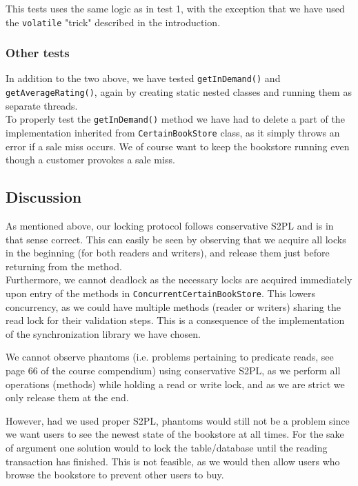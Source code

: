 \documentclass[11pt]{article}
\begin{document}
This tests uses the same logic as in test 1, with the exception that we have used
the \texttt{volatile} "trick" described in the introduction.

\subsubsection*{Other tests}

In addition to the two above, we have tested \texttt{getInDemand()} and
\texttt{getAverageRating()}, again by creating static nested classes and
running them as separate threads.\\
To properly test the \texttt{getInDemand()} method we have had to delete
a part of the implementation inherited from \texttt{CertainBookStore} class,
as it simply throws an error if a sale miss occurs. We of course want
to keep the bookstore running even though a customer provokes a sale miss.

\subsection*{Discussion}

As mentioned above, our locking protocol follows conservative S2PL and
is in that sense correct. This can easily be seen by observing that we
acquire all locks in the beginning (for both readers and writers), and
release them just before returning from the method.\\

Furthermore, we cannot deadlock as the necessary 
locks are acquired immediately upon entry of the methods in
\texttt{ConcurrentCertainBookStore}.
This lowers concurrency, as we could have multiple methods (reader or
writers) sharing the read lock for their validation steps.
This is a consequence of the implementation of the synchronization
library we have chosen.

We cannot observe phantoms (i.e. problems pertaining to predicate reads, see page 66
of the course compendium) using conservative S2PL, as we perform all
operations (methods) while holding a read or write lock, and as we are
strict we only release them at the end.

However, had we used proper S2PL, phantoms would still not be a problem since
we want users to see the newest state of the bookstore at all times.
For the sake of argument one solution would to lock the table/database
until the reading transaction has finished. This is not feasible, as we would
then allow users who browse the bookstore to prevent other users to buy.  
\end{document}
